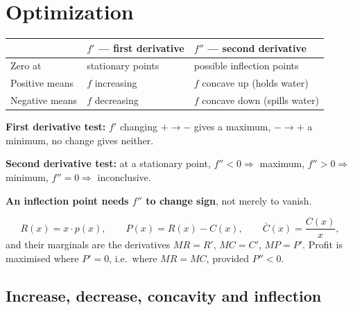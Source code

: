 \chapter{Optimization}


\begin{keyidea}
\begin{center}
\small\sffamily
\begin{tabular}{@{}L{3.4cm} L{4.6cm} L{5.4cm}@{}}
\toprule
 & \textbf{$f'$ --- first derivative} & \textbf{$f''$ --- second derivative} \\
\midrule
Zero at        & stationary points        & possible inflection points \\
Positive means & $f$ increasing           & $f$ concave up (holds water) \\
Negative means & $f$ decreasing           & $f$ concave down (spills water) \\
\bottomrule
\end{tabular}
\end{center}

\medskip
\textbf{First derivative test:} $f'$ changing $+\to-$ gives a maximum,
$-\to+$ a minimum, no change gives neither.

\textbf{Second derivative test:} at a stationary point,
$f''<0\Rightarrow$ maximum, $f''>0\Rightarrow$ minimum,
$f''=0\Rightarrow$ inconclusive.

\medskip
\textbf{An inflection point needs $f''$ to change sign}, not merely to vanish.
\end{keyidea}

\begin{keyidea}
\[
R(x)=x\cdot p(x),\qquad
P(x)=R(x)-C(x),\qquad
\bar{C}(x)=\frac{C(x)}{x},
\]
and their marginals are the derivatives $MR=R'$, $MC=C'$, $MP=P'$. Profit is
maximised where $P'=0$, i.e.\ where $MR=MC$, provided $P''<0$.
\end{keyidea}

\section{Increase, decrease, concavity and inflection}

